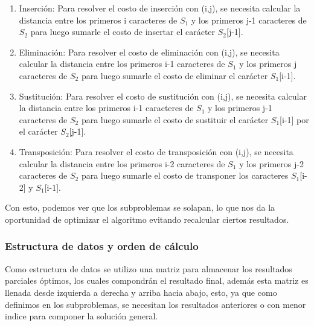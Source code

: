 \begin{enumerate}
    \item Inserción: Para resolver el costo de inserción con (i,j), se necesita
    calcular la distancia entre los primeros i caracteres de $S_1$ y los primeros
    j-1 caracteres de $S_2$ para luego sumarle el costo de insertar el carácter
    $S_2$[j-1].
    \item Eliminación: Para resolver el costo de eliminación con (i,j), se necesita
    calcular la distancia entre los primeros i-1 caracteres de $S_1$ y los primeros
    j caracteres de $S_2$ para luego sumarle el costo de eliminar el carácter
    $S_1$[i-1].
    \item Sustitución: Para resolver el costo de sustitución con (i,j), se necesita
    calcular la distancia entre los primeros i-1 caracteres de $S_1$ y los primeros
    j-1 caracteres de $S_2$ para luego sumarle el costo de sustituir el carácter
    $S_1$[i-1] por el carácter $S_2$[j-1].
    \item Transposición: Para resolver el costo de transposición con (i,j), se necesita
    calcular la distancia entre los primeros i-2 caracteres de $S_1$ y los primeros
    j-2 caracteres de $S_2$ para luego sumarle el costo de transponer los caracteres
    $S_1$[i-2] y $S_1$[i-1].

\end{enumerate}

Con esto, podemos ver que los subproblemas se solapan, lo que nos da la oportunidad
de optimizar el algoritmo evitando recalcular ciertos resultados.

\subsubsection{Estructura de datos y orden de cálculo}

Como estructura de datos se utilizo una matriz para almacenar los resultados
parciales óptimos, los cuales compondrán el resultado final, además esta matriz 
es llenada desde izquierda a derecha y arriba hacia abajo, esto, ya que como definimos
en los subproblemas, se necesitan los resultados anteriores o con menor indice para componer
la solución general.